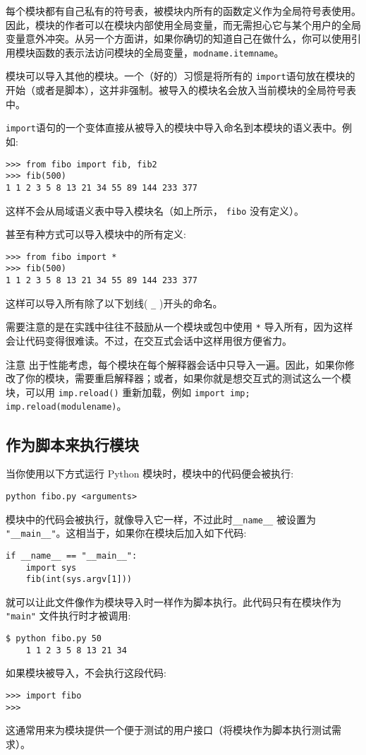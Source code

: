 每个模块都有自己私有的符号表，被模块内所有的函数定义作为全局符号表使用。因此，模块的作者可以在模块内部使用全局变量，而无需担心它与某个用户的全局变量意外冲突。从另一个方面讲，如果你确切的知道自己在做什么，你可以使用引用模块函数的表示法访问模块的全局变量，\texttt{modname.itemname}。

模块可以导入其他的模块。一个（好的）习惯是将所有的 \texttt{import}语句放在模块的开始（或者是脚本），这并非强制。被导入的模块名会放入当前模块的全局符号表中。

\texttt{import}语句的一个变体直接从被导入的模块中导入命名到本模块的语义表中。例如:
\begin{lstlisting}
>>> from fibo import fib, fib2
>>> fib(500)
1 1 2 3 5 8 13 21 34 55 89 144 233 377
\end{lstlisting}
这样不会从局域语义表中导入模块名（如上所示， \texttt{fibo} 没有定义）。

甚至有种方式可以导入模块中的所有定义:
\begin{lstlisting}
>>> from fibo import *
>>> fib(500)
1 1 2 3 5 8 13 21 34 55 89 144 233 377
\end{lstlisting}
这样可以导入所有除了以下划线( \verb|_| )开头的命名。

需要注意的是在实践中往往不鼓励从一个模块或包中使用 \verb|*| 导入所有，因为这样会让代码变得很难读。不过，在交互式会话中这样用很方便省力。

\begin{Warning}{注意}
出于性能考虑，每个模块在每个解释器会话中只导入一遍。因此，如果你修改了你的模块，需要重启解释器；或者，如果你就是想交互式的测试这么一个模块，可以用 \texttt{imp.reload()} 重新加载，例如 \texttt{import imp; imp.reload(modulename)}。
\end{Warning}
\subsection{作为脚本来执行模块}
当你使用以下方式运行 Python 模块时，模块中的代码便会被执行:
\begin{Verbatim}[fontfamily=tt]
python fibo.py <arguments>
\end{Verbatim}
模块中的代码会被执行，就像导入它一样，不过此时\verb|__name__| 被设置为 \verb|"__main__"|。这相当于，如果你在模块后加入如下代码:
\begin{lstlisting}
if __name__ == "__main__":
    import sys
    fib(int(sys.argv[1]))
\end{lstlisting}
就可以让此文件像作为模块导入时一样作为脚本执行。此代码只有在模块作为 \texttt{"main"} 文件执行时才被调用:
    \begin{Verbatim}[fontfamily=tt]
    $ python fibo.py 50
    1 1 2 3 5 8 13 21 34
    \end{Verbatim}
如果模块被导入，不会执行这段代码:
\begin{lstlisting}
>>> import fibo
>>>
\end{lstlisting}
这通常用来为模块提供一个便于测试的用户接口（将模块作为脚本执行测试需求）。
